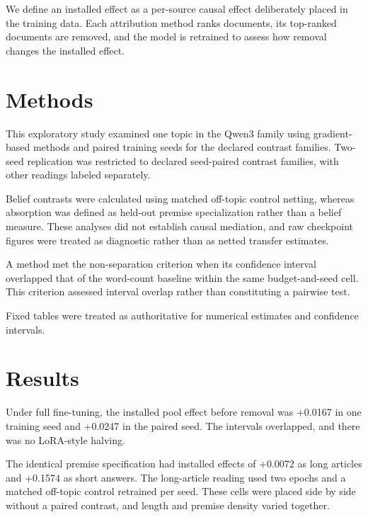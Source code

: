 \documentclass[10pt]{article}
\begin{document}
We define an installed effect as a per-source causal effect deliberately placed in the training data. Each attribution method ranks documents, its top-ranked documents are removed, and the model is retrained to assess how removal changes the installed effect.






\section{ Methods }
\label{sec:methods}

This exploratory study examined one topic in the Qwen3 family using gradient-based methods and paired training seeds for the declared contrast families. Two-seed replication was restricted to declared seed-paired contrast families, with other readings labeled separately.



Belief contrasts were calculated using matched off-topic control netting, whereas absorption was defined as held-out premise specialization rather than a belief measure. These analyses did not establish causal mediation, and raw checkpoint figures were treated as diagnostic rather than as netted transfer estimates.



A method met the non-separation criterion when its confidence interval overlapped that of the word-count baseline within the same budget-and-seed cell. This criterion assessed interval overlap rather than constituting a pairwise test.



Fixed tables were treated as authoritative for numerical estimates and confidence intervals.






\section{ Results }
\label{sec:results}

Under full fine-tuning, the installed pool effect before removal was +0.0167 in one training seed and +0.0247 in the paired seed. The intervals overlapped, and there was no LoRA-style halving.



The identical premise specification had installed effects of +0.0072 as long articles and +0.1574 as short answers. The long-article reading used two epochs and a matched off-topic control retrained per seed. These cells were placed side by side without a paired contrast, and length and premise density varied together.
\end{document}
